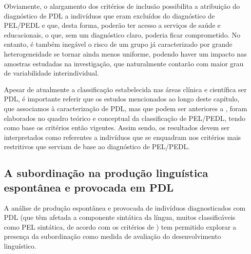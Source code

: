 \documentclass[output=paper,colorlinks,citecolor=brown,booklanguage=portuguese]{langscibook}
\begin{document}
Obviamente, o alargamento dos critérios de inclusão possibilita a atribuição do diagnóstico de PDL a indivíduos que eram excluídos do diagnóstico de PEL/PEDL e que, desta forma, poderão ter acesso a serviços de saúde e educacionais, o que, sem um diagnóstico claro, poderia ficar comprometido. No entanto, é também inegável o risco de um grupo já caracterizado por grande heterogeneidade se tornar ainda menos uniforme, podendo haver um impacto nas amostras estudadas na investigação, que naturalmente contarão com maior grau de variabilidade interindividual. 

Apesar de atualmente a classificação estabelecida nas áreas clínica e científica ser PDL, é importante referir que os estudos mencionados ao longo deste capítulo, que associamos à caracterização de PDL, mas que podem ser anteriores a \citet{Bishop2017}, foram elaborados no quadro teórico e conceptual da classificação de PEL/PEDL, tendo como base os critérios então vigentes. Assim sendo, os resultados devem ser interpretados como referentes a indivíduos que se enquadram nos critérios mais restritivos que serviam de base ao diagnóstico de PEL/PEDL. 

\subsection{A subordinação na produção linguística espontânea e provocada em PDL}\label{sec:partedoispontodoiscap13}
A análise de produção espontânea e provocada de indivíduos diagnosticados com PDL (que têm afetada a componente sintática da língua, muitos classificáveis como PEL sintática, de acordo com os critérios de \citealp{Friedmann2008}) tem permitido explorar a presença da subordinação como medida de avaliação do desenvolvimento linguístico.
\end{document}
